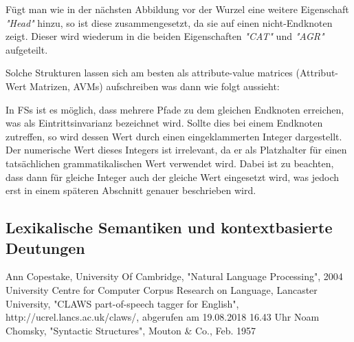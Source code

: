 \documentclass[12pt]{paper}
\begin{document}
Fügt man wie in der nächsten Abbildung vor der Wurzel eine weitere Eigenschaft \textit{"Head"} hinzu, so ist diese zusammengesetzt, da sie auf einen nicht-Endknoten zeigt. Dieser wird wiederum in die beiden Eigenschaften \textit{"CAT"} und \textit{"AGR"} aufgeteilt. 

\begin{center}
\end{center}

Solche Strukturen lassen sich am besten als attribute-value matrices (Attribut-Wert Matrizen, AVMs) aufschreiben was dann wie folgt aussieht:



In FSs ist es möglich, dass mehrere Pfade zu dem gleichen Endknoten erreichen, was als Eintrittsinvarianz bezeichnet wird. Sollte dies bei einem Endknoten zutreffen, so wird dessen Wert durch einen eingeklammerten Integer dargestellt. Der numerische Wert dieses Integers ist irrelevant, da er als Platzhalter für einen tatsächlichen grammatikalischen Wert verwendet wird. Dabei ist zu beachten, dass dann für gleiche Integer auch der gleiche Wert eingesetzt wird, was jedoch erst in einem späteren Abschnitt genauer beschrieben wird. 



\subsection{Lexikalische Semantiken und kontextbasierte Deutungen}

\newpage

\begin{thebibliography}{5}
Ann Copestake, University Of Cambridge, "Natural Language Processing", 2004
University Centre for Computer Corpus Research on Language, Lancaster University, "CLAWS part-of-speech tagger for English", http://ucrel.lancs.ac.uk/claws/, abgerufen am 19.08.2018 16.43 Uhr
 Noam Chomsky, "Syntactic Structures", Mouton \& Co., Feb. 1957

\end{thebibliography}
\end{document}
